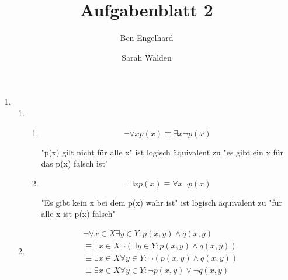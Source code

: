 \documentclass{article}
\begin{document}
\title{Aufgabenblatt 2}
\author{Ben Engelhard \and Sarah Walden}
\date{}

\maketitle

\begin{enumerate}[label=\arabic*)]
    \item
          \begin{enumerate}[label=\alph*)]
              \item
                    \begin{enumerate}[label=(\roman*)]
                        \item
                              \begin{equation}
                                  \neg\forall x p(x) \equiv \exists x \neg p(x)
                              \end{equation}
                              \begin{flushleft}
                                  "p(x) gilt nicht für alle x" ist logisch äquivalent zu "es gibt ein x für das p(x) falsch ist"
                              \end{flushleft}
                        \item
                              \begin{equation}
                                  \neg\exists x p(x) \equiv \forall x \neg p(x)
                              \end{equation}
                              \begin{flushleft}
                                  "Es gibt kein x bei dem p(x) wahr ist" ist logisch äquivalent zu "für alle x ist p(x) falsch"
                              \end{flushleft}
                    \end{enumerate}
              \item
                    \begin{align}
                        \nonumber\neg\forall x \in X \exists y\in Y : p(x,y) \wedge q(x,y)            \\
                        \nonumber\equiv \exists x \in X \neg (\exists y \in Y : p(x,y) \wedge q(x,y)) \\
                        \nonumber\equiv \exists x \in X \forall y \in Y : \neg (p(x,y) \wedge q(x,y)) \\
                        \equiv \exists x \in X \forall y \in Y : \neg p(x,y) \vee \neg q(x,y)

\end{align}
\end{enumerate}
\end{enumerate}
\end{document}
